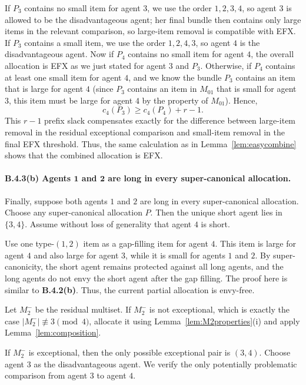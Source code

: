 \documentclass{article}
\theoremstyle{definition}
\begin{document}
If $P_3$ contains no small item for agent $3$, we use the order $1,2,3,4$,
so agent $3$ is allowed to be the disadvantageous agent; her final bundle then
contains only large items in the relevant comparison, so large-item removal is
compatible with EFX.  If $P_3$ contains a small item, we use the order
$1,2,4,3$, so agent $4$ is the disadvantageous agent. Now if $P_4$ contains no small item for agent $4$, the overall allocation is EFX as we just stated for agent $3$ and $P_3$. Otherwise, if $P_4$ contains at least one small item for agent $4$, and we know the bundle $P_3$ contains an item that is large for agent $4$ (since $P_3$ contains an item in $M_{01}$ that is small for agent $3$, this item must be large for agent $4$ by the property of $M_{01}$). Hence,
\[
    c_4(P_3)\ge c_4(P_4)+r-1.
\]
This $r-1$ prefix slack compensates exactly for the difference between
large-item removal in the residual exceptional comparison and small-item
removal in the final EFX threshold.  Thus, the same calculation as in
Lemma~\ref{lem:easycombine} shows that the combined allocation is EFX.

\paragraph{B.4.3(b) Agents $\boldsymbol{1}$ and $\boldsymbol{2}$ are long in every super-canonical allocation.}
Finally, suppose both agents $1$ and $2$ are long in every super-canonical
allocation.  Choose any super-canonical allocation $P$.  Then the unique short
agent lies in $\{3,4\}$.  Assume without loss of generality that agent $4$ is
short.

Use one type-$(1,2)$ item as a gap-filling item for agent $4$.  This item is
large for agent $4$ and also large for agent $3$, while it is small for
agents $1$ and $2$.  By super-canonicity, the short agent remains protected
against all long agents, and the long agents do not envy the short agent after
the gap filling. The proof here is similar to \textbf{B.4.2(b)}. Thus, the current partial allocation is envy-free.

Let $M_2^-$ be the residual multiset.  If $M_2^-$ is not exceptional, which
is exactly the case $|M_2^-|\not\equiv 3\pmod 4$, allocate it using
Lemma~\ref{lem:M2properties}(i) and apply Lemma~\ref{lem:composition}.

If $M_2^-$ is exceptional, then the only possible exceptional pair is
$(3,4)$.  Choose agent $3$ as the disadvantageous agent.  We verify the only
potentially problematic comparison from agent $3$ to agent $4$.
\end{document}
